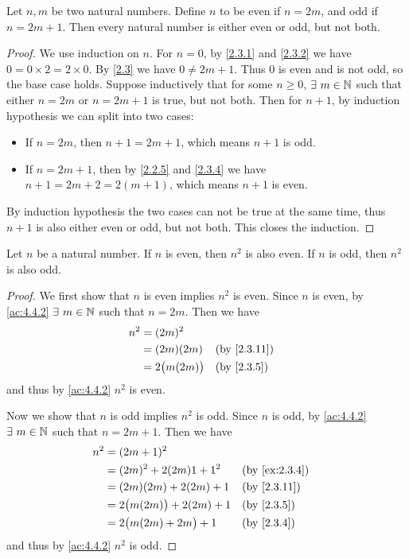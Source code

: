 \begin{ac}\label{ac:4.4.2}
  Let \(n, m\) be two natural numbers.
  Define \(n\) to be even if \(n = 2m\), and odd if \(n = 2m + 1\).
  Then every natural number is either even or odd, but not both.
\end{ac}

\begin{proof}
  We use induction on \(n\).
  For \(n = 0\), by \cref{2.3.1} and \cref{2.3.2} we have \(0 = 0 \times 2 = 2 \times 0\).
  By \cref{2.3} we have \(0 \neq 2m + 1\).
  Thus \(0\) is even and is not odd, so the base case holds.
  Suppose inductively that for some \(n \geq 0\), \(\exists\ m \in \mathbb{N}\) such that either \(n = 2m\) or \(n = 2m + 1\) is true, but not both.
  Then for \(n + 1\), by induction hypothesis we can split into two cases:
  \begin{itemize}
    \item If \(n = 2m\), then \(n + 1 = 2m + 1\), which means \(n + 1\) is odd.
    \item If \(n = 2m + 1\), then by \cref{2.2.5} and \cref{2.3.4} we have \(n + 1 = 2m + 2 = 2(m + 1)\), which means \(n + 1\) is even.
  \end{itemize}
  By induction hypothesis the two cases can not be true at the same time, thus \(n + 1\) is also either even or odd, but not both.
  This closes the induction.
\end{proof}

\begin{ac}\label{ac:4.4.3}
  Let \(n\) be a natural number.
  If \(n\) is even, then \(n^2\) is also even.
  If \(n\) is odd, then \(n^2\) is also odd.
\end{ac}

\begin{proof}
  We first show that \(n\) is even implies \(n^2\) is even.
  Since \(n\) is even, by \cref{ac:4.4.2} \(\exists\ m \in \mathbb{N}\) such that \(n = 2m\).
  Then we have
  \begin{align*}
    n^2 & = (2m)^2                                          \\
        & = (2m)(2m)         &  & \text{(by \cref{2.3.11})} \\
        & = 2\big(m(2m)\big) &  & \text{(by \cref{2.3.5})}
  \end{align*}
  and thus by \cref{ac:4.4.2} \(n^2\) is even.

  Now we show that \(n\) is odd implies \(n^2\) is odd.
  Since \(n\) is odd, by \cref{ac:4.4.2} \(\exists\ m \in \mathbb{N}\) such that \(n = 2m + 1\).
  Then we have
  \begin{align*}
    n^2 & = (2m + 1)^2                                                    \\
        & = (2m)^2 + 2(2m)1 + 1^2        &  & \text{(by \cref{ex:2.3.4})} \\
        & = (2m)(2m) + 2(2m) + 1         &  & \text{(by \cref{2.3.11})}   \\
        & = 2\big(m(2m)\big) + 2(2m) + 1 &  & \text{(by \cref{2.3.5})}    \\
        & = 2\big(m(2m) + 2m\big) + 1    &  & \text{(by \cref{2.3.4})}
  \end{align*}
  and thus by \cref{ac:4.4.2} \(n^2\) is odd.
\end{proof}

